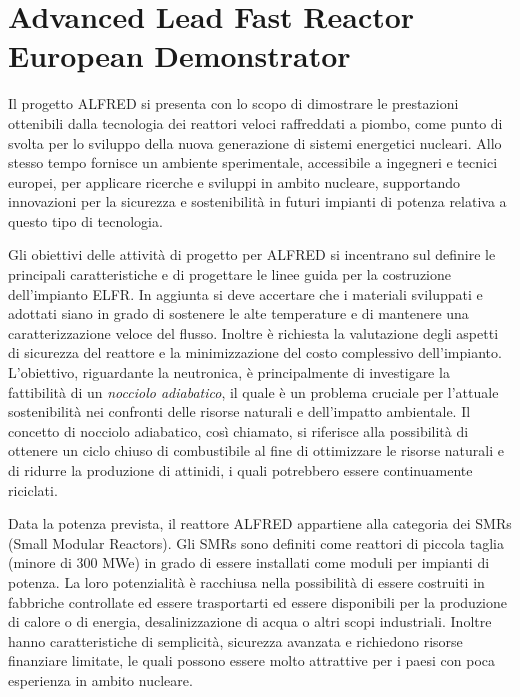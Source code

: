 \section{Advanced Lead Fast Reactor European Demonstrator}

Il progetto ALFRED si presenta con lo scopo di dimostrare le prestazioni 
ottenibili dalla tecnologia dei reattori veloci raffreddati a piombo, come 
punto 
di svolta per lo sviluppo della nuova generazione di sistemi energetici 
nucleari. Allo stesso tempo fornisce un ambiente sperimentale, accessibile a 
ingegneri 
e tecnici europei, per applicare ricerche e sviluppi in ambito nucleare, 
supportando innovazioni per la sicurezza e sostenibilità in futuri impianti di 
potenza relativa a questo tipo di tecnologia.

Gli obiettivi delle attività di progetto per ALFRED  si incentrano sul definire 
le principali caratteristiche e di progettare le linee guida per la costruzione 
dell'impianto ELFR. \cite{nurethalfred}
In aggiunta si deve accertare che i materiali sviluppati e adottati siano in 
grado 
di sostenere le alte temperature e di mantenere una caratterizzazione veloce 
del 
flusso.
Inoltre è richiesta la valutazione degli aspetti di sicurezza del reattore e 
la minimizzazione del costo complessivo dell'impianto.
L'obiettivo, riguardante la neutronica, è principalmente di investigare la 
fattibilità di un \textit{nocciolo adiabatico}, il quale è un problema cruciale 
per 
l'attuale sostenibilità nei confronti delle risorse naturali e dell'impatto 
ambientale. Il concetto di nocciolo adiabatico, così chiamato, si riferisce 
alla 
possibilità di ottenere un ciclo chiuso di combustibile al fine di ottimizzare 
le risorse naturali e di ridurre la produzione di attinidi, i quali 
potrebbero essere continuamente riciclati. \cite{adiabaticgrasso}

Data la potenza prevista, il reattore ALFRED appartiene alla categoria dei 
SMRs (Small Modular Reactors). 
Gli SMRs sono definiti come reattori di piccola taglia (minore di 300 MWe) in 
grado di essere installati come moduli per impianti di potenza. 
La loro potenzialità è racchiusa nella possibilità di essere costruiti in 
fabbriche controllate ed essere trasportarti ed essere disponibili per la 
produzione di calore o di energia, desalinizzazione di acqua o altri scopi 
industriali. 
Inoltre hanno caratteristiche di semplicità, sicurezza avanzata e richiedono 
risorse finanziare limitate, le quali possono essere molto attrattive per i 
paesi con poca esperienza in ambito nucleare. \cite{smrlocatelli}

